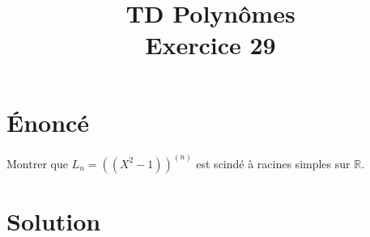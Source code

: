 \documentclass[french]{article}
\title{TD Polynômes \\ Exercice 29}
\date{}
\newcommand{\R}{\mathbb{R}}
\begin{document}
\maketitle

\section{Énoncé}
Montrer que $L_n=\left((X^2-1)\right)^{(n)}$ est scindé à racines simples sur $\R$.
\section{Solution}
\end{document}
